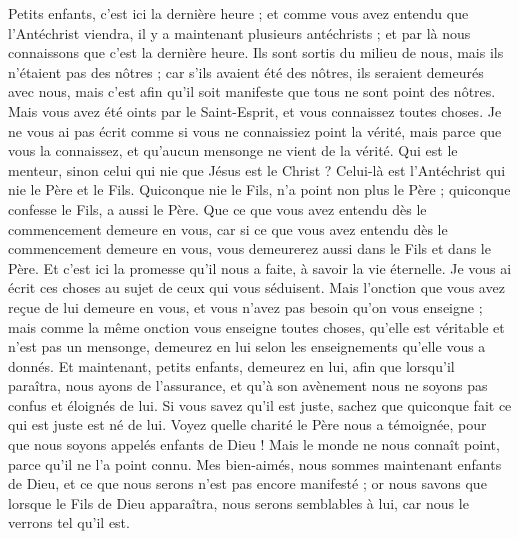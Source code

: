 \begin{multicols}{2}
Petits enfants, c'est ici la dernière{} heure ; et comme vous avez entendu que l'Antéchrist viendra, il y a maintenant plusieurs antéchrists ; et par là nous connaissons que c'est la dernière heure.
Ils sont sortis du milieu de nous, mais ils n'étaient pas des nôtres ; car s'ils avaient été des nôtres, ils seraient demeurés avec nous, mais c'est afin qu'il soit manifeste que tous ne sont point des nôtres.
Mais vous avez été oints par le Saint-Esprit, et vous connaissez toutes choses.
Je ne vous ai pas écrit comme si vous ne connaissiez point la vérité, mais parce que vous la connaissez, et qu'aucun mensonge ne vient de la vérité.
Qui est le menteur, sinon celui qui nie que Jésus est le Christ ? Celui-là est l'Antéchrist qui nie le Père et le Fils.
Quiconque nie le Fils, n'a point non plus le Père ; quiconque confesse le Fils, a aussi le Père.
Que ce que vous avez entendu dès le commencement demeure en vous, car si ce que vous avez entendu dès le commencement demeure en vous, vous demeurerez aussi dans le Fils et dans le Père.
Et c'est ici la promesse qu'il nous a faite, à savoir la vie éternelle.
Je vous ai écrit ces choses au sujet de ceux qui vous séduisent.
Mais l'onction que vous avez reçue de lui demeure en vous, et vous n'avez pas besoin qu'on vous enseigne ; mais comme la même onction vous enseigne toutes choses, qu'elle est véritable et n'est pas un mensonge, demeurez en lui selon les enseignements qu’elle vous a donnés.
Et maintenant, petits enfants, demeurez en lui, afin que lorsqu’il paraîtra, nous ayons de l’assurance, et qu’à son avènement{} nous ne soyons pas confus et éloignés de lui.
Si vous savez qu'il est juste, sachez que quiconque fait ce qui est juste est né de lui.
\VerseOne{}Voyez quelle charité le Père nous a témoignée, pour que nous soyons appelés enfants de Dieu ! Mais le monde ne nous connaît point, parce qu'il ne l'a point connu.
Mes bien-aimés, nous sommes maintenant enfants de Dieu, et ce que nous serons n'est pas encore manifesté ; or nous savons que lorsque le Fils de Dieu apparaîtra, nous serons semblables à lui, car nous le verrons tel qu'il est.

\end{multicols}
